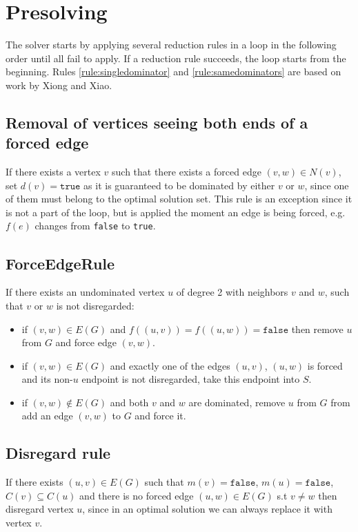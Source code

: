 \documentclass[a4paper,UKenglish,cleveref, autoref, thm-restate]{lipics-v2021}
\begin{document}
\section{Presolving}
The solver starts by applying several reduction rules in a loop in the following order until all fail to apply. If a reduction rule succeeds, the loop starts from the beginning.
Rules \ref{rule:singledominator} and \ref{rule:samedominators} are based on work by Xiong and Xiao\cite{DBLP:conf/ijcai/Xiong024}.
\subsection{Removal of vertices seeing both ends of a forced edge}
If there exists a vertex $v$ such that there exists a forced edge $(v, w) \in N(v)$, set $d(v) = \texttt{true}$ as it is guaranteed to be dominated by either $v$ or $w$, since one of them must belong to the optimal solution set.
This rule is an exception since it is not a part of the loop, but is applied the moment an edge is being forced, e.g. $f(e)$ changes from \texttt{false} to \texttt{true}.

\subsection{ForceEdgeRule}
If there exists an undominated vertex $u$ of degree 2 with neighbors $v$ and $w$, such that $v$ or $w$ is not disregarded:
\begin{itemize}
    \item if $(v, w) \in E(G)$ and $f((u, v)) = f((u, w)) = \texttt{false}$ then remove $u$ from $G$ and force edge $(v, w)$.
    \item if $(v, w) \in E(G)$ and exactly one of the edges $(u, v)$, $(u, w)$ is forced and its non-$u$ endpoint is not disregarded, take this endpoint into $S$.
    \item if $(v, w) \notin E(G)$ and both $v$ and $w$ are dominated, remove $u$ from $G$ from add an edge $(v, w)$ to $G$ and force it.
\end{itemize}

\subsection{Disregard rule}
If there exists $(u, v) \in E(G)$ such that $m(v) = \texttt{false}$, $m(u) = \texttt{false}$, $C(v) \subseteq C(u)$ and there is no forced edge $(u, w) \in E(G)$ s.t $v \neq w$
then disregard vertex $u$, since in an optimal solution we can always replace it with vertex $v$.
\end{document}
